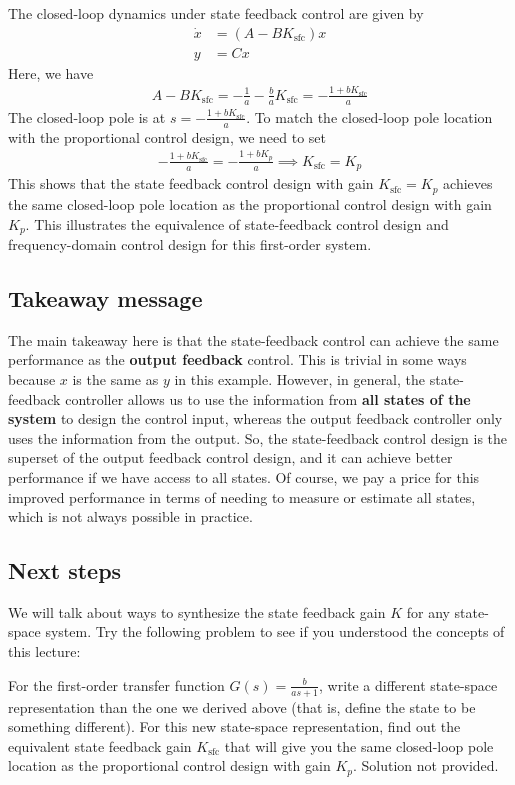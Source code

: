 \documentclass{ee122_notes}
\begin{document}
The closed-loop dynamics under state feedback control are given by
\begin{align*}
    \dot x &= (A - BK_{\text{sfc}})x \\
    y &= Cx
\end{align*}
Here, we have 
\begin{align*}
    A - BK_{\text{sfc}} = -\frac{1}{a} - \frac{b}{a}K_{\text{sfc}} = -\frac{1 + bK_{\text{sfc}}}{a}
\end{align*}
The closed-loop pole is at $s = -\frac{1 + bK_{\text{sfc}}}{a}$. To match the closed-loop pole location with the proportional control design, we need to set
\begin{align*}
    -\frac{1 + bK_{\text{sfc}}}{a} = -\frac{1 + bK_p}{a} \implies K_{\text{sfc}} = K_p
\end{align*}
This shows that the state feedback control design with gain $K_{\text{sfc}} = K_p$ achieves the same closed-loop pole location as the proportional control design with gain $K_p$. This illustrates the equivalence of state-feedback control design and frequency-domain control design for this first-order system.

\subsection{Takeaway message}
The main takeaway here is that the state-feedback control can achieve the same performance as the \textbf{output feedback} control. This is trivial in some ways because $x$ is the same as $y$ in this example. However, in general, the state-feedback controller allows us to use the information from \textbf{all states of the system} to design the control input, whereas the output feedback controller only uses the information from the output. So, the state-feedback control design is the superset of the output feedback control design, and it can achieve better performance if we have access to all states. Of course, we pay a price for this improved performance in terms of needing to measure or estimate all states, which is not always possible in practice. 

\subsection{Next steps}
We will talk about ways to synthesize the state feedback gain $K$ for any state-space system. Try the following problem to see if you understood the concepts of this lecture:
\begin{popquiz}
For the first-order transfer function $G(s) = \frac{b}{as + 1}$, write a different state-space representation than the one we derived above (that is, define the state to be something different). For this new state-space representation, find out the equivalent state feedback gain $K_{\text{sfc}}$ that will give you the same closed-loop pole location as the proportional control design with gain $K_p$.
\popqsplit
Solution not provided. 
\end{popquiz}
\end{document}
